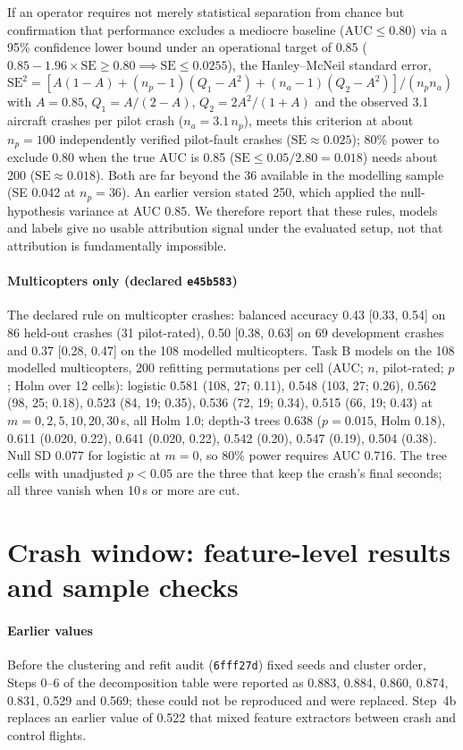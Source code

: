 \documentclass[preprint,12pt]{elsarticle}
\begin{document}
If an operator requires not merely statistical separation from chance but confirmation that performance excludes a mediocre baseline ($\text{AUC} \le 0.80$) via a 95\% confidence lower bound under an operational target of 0.85 ($0.85 - 1.96 \times \text{SE} \ge 0.80 \implies \text{SE} \le 0.0255$), the Hanley--McNeil standard error, $\text{SE}^2 = [A(1-A) + (n_p-1)(Q_1-A^2) + (n_a-1)(Q_2-A^2)]/(n_p n_a)$ with $A=0.85$, $Q_1 = A/(2-A)$, $Q_2 = 2A^2/(1+A)$ and the observed 3.1 aircraft crashes per pilot crash ($n_a = 3.1\,n_p$), meets this criterion at about $n_p = 100$ independently verified pilot-fault crashes ($\text{SE} \approx 0.025$); 80\% power to exclude 0.80 when the true AUC is 0.85 ($\text{SE} \le 0.05/2.80 = 0.018$) needs about 200 ($\text{SE} \approx 0.018$). Both are far beyond the 36 available in the modelling sample (SE 0.042 at $n_p=36$). An earlier version stated 250, which applied the null-hypothesis variance at AUC 0.85. We therefore report that these rules, models and labels give no usable attribution signal under the evaluated setup, not that attribution is fundamentally impossible.

\paragraph{Multicopters only (declared \texttt{e45b583})} The declared rule on multicopter crashes: balanced accuracy 0.43 [0.33, 0.54] on 86 held-out crashes (31 pilot-rated), 0.50 [0.38, 0.63] on 69 development crashes and 0.37 [0.28, 0.47] on the 108 modelled multicopters. Task B models on the 108 modelled multicopters, 200 refitting permutations per cell (AUC; $n$, pilot-rated; $p$; Holm over 12 cells): logistic 0.581 (108, 27; 0.11), 0.548 (103, 27; 0.26), 0.562 (98, 25; 0.18), 0.523 (84, 19; 0.35), 0.536 (72, 19; 0.34), 0.515 (66, 19; 0.43) at $m=0,2,5,10,20,30$\,s, all Holm 1.0; depth-3 trees 0.638 ($p=0.015$, Holm 0.18), 0.611 (0.020, 0.22), 0.641 (0.020, 0.22), 0.542 (0.20), 0.547 (0.19), 0.504 (0.38). Null SD 0.077 for logistic at $m=0$, so 80\% power requires AUC 0.716. The tree cells with unadjusted $p<0.05$ are the three that keep the crash's final seconds; all three vanish when 10\,s or more are cut.
\FloatBarrier

\section{Crash window: feature-level results and sample checks}
\label{sup:window}
\paragraph{Earlier values} Before the clustering and refit audit (\texttt{6fff27d}) fixed seeds and cluster order, Steps 0--6 of the decomposition table were reported as 0.883, 0.884, 0.860, 0.874, 0.831, 0.529 and 0.569; these could not be reproduced and were replaced. Step~4b replaces an earlier value of 0.522 that mixed feature extractors between crash and control flights.
\end{document}
